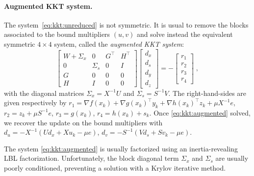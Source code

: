 \paragraph{Augmented KKT system.}
The system~\eqref{eq:kkt:unreduced} is not symmetric.
It is usual to remove the blocks associated
to the bound multipliers $(u, v)$ and solve instead the equivalent
symmetric $4 \times 4$ system, called the \emph{augmented KKT system}:
\begin{equation}
  \label{eq:kkt:augmented}
  \tag{$K_2$}
  \begin{bmatrix}
    W + \Sigma_x & 0 & G^\top & H^\top \\
    0 & \Sigma_s & 0& I \\
    G & 0 & 0 & 0 \\
    H & I & 0 & 0
  \end{bmatrix}
  \begin{bmatrix}
    d_x \\
    d_s \\
    d_y \\
    d_z
  \end{bmatrix}
  = - \begin{bmatrix}
    r_1 \\ r_2 \\ r_3 \\ r_4
  \end{bmatrix} \; ,
\end{equation}
with the diagonal matrices $\Sigma_x = X^{-1} U$ and $\Sigma_s = S^{-1} V$.
The right-hand-sides are given respectively by
$r_1 = \nabla f(x_k) + \nabla g(x_k)^\top y_k + \nabla h(x_k)^\top z_k + \mu X^{-1} e$,
$r_2 = z_k + \mu S^{-1} e$,
$r_3 = g(x_k)$,
$r_4 = h(x_k) + s_k$.
Once \eqref{eq:kkt:augmented} solved, we recover the
update on the bound multipliers with
$d_u = - X^{-1}(U d_x + X u_k - \mu e)$,
$d_v = - S^{-1}(V d_s + S v_k - \mu e)$.

The system \eqref{eq:kkt:augmented} is usually factorized using
an inertia-revealing LBL factorization.
Unfortunately, the block diagonal term
$\Sigma_x$ and $\Sigma_s$ are usually poorly conditioned, preventing
a solution with a Krylov iterative method.

